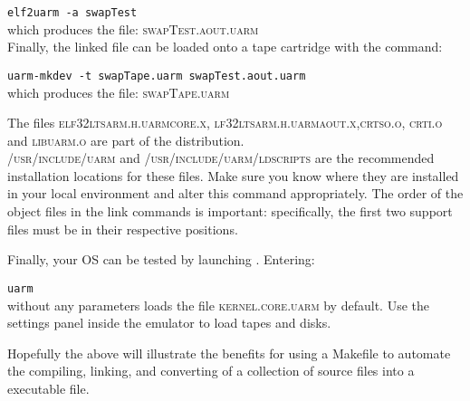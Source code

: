 \vspace{0.1cm}
\verb+elf2uarm -a swapTest+
\vspace{0.1cm}\\
which produces the file: \textsc{swapTest.aout.uarm}\\
Finally, the linked file can be loaded onto a tape cartridge with the command:

\vspace{0.1cm}
\verb+uarm-mkdev -t swapTape.uarm swapTest.aout.uarm+
\vspace{0.1cm}\\
which produces the file: \textsc{swapTape.uarm}

The files \textsc{elf32ltsarm.h.uarmcore.x}, \textsc{lf32ltsarm.h.uarmaout.x},\linebreak \textsc{crtso.o}, \textsc{crti.o} and \textsc{libuarm.o} are part of the \uarm{} distribution.\\
\textsc{/usr/include/uarm} and \textsc{/usr/include/uarm/ldscripts} are the recommended installation locations for these files. 
Make sure you know where they are installed in your local environment and alter this command appropriately. 
The order of the object files in the link commands is important: specifically, the first two support files must be in their respective positions.

Finally, your OS can be tested by launching \uarm{}. Entering:

\vspace{0.1cm}
\verb+uarm+
\vspace{0.1cm}\\
without any parameters loads the file \textsc{kernel.core.uarm} by default.
Use the settings panel inside the emulator to load tapes and disks.

Hopefully the above will illustrate the benefits for using a Makefile to automate the compiling, linking, and converting of a collection of source files into a \uarm{} executable file.

